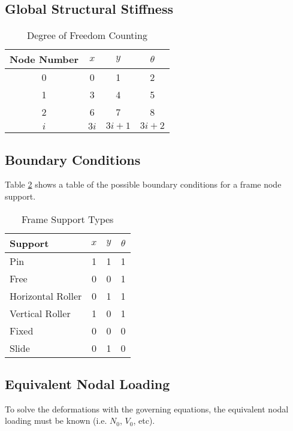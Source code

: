 \subsection{Global Structural Stiffness}


\begin{table}[h]
\centering
\caption{Degree of Freedom Counting}
\label{Tab:FrameDoFCount}
\begin{tabular}{|c|c|c|c|}
\hline
Node Number & $x$ & $y$ & $\theta$ \\ \hline
0 & 0 & 1 & 2\\ \hline
1 & 3 & 4 & 5 \\ \hline
2 & 6 & 7  & 8\\ \hline
$i$ & $3i$ & $3i+1$ & $3i+2$\\ \hline
\end{tabular}
\end{table}




\subsection{Boundary Conditions}

Table \ref{Tab:FrameSupports} shows a table of the possible boundary conditions for a frame node support.

\begin{table}[h]
\centering
\caption{Frame Support Types}
\label{Tab:FrameSupports}
\begin{tabular}{|l|c|c|c|}
\hline
Support & $x$ & $y$ & $\theta$\\ \hline
Pin     & 1 & 1 & 1\\ \hline
Free    & 0 & 0 & 1\\ \hline
Horizontal Roller & 0& 1 & 1 \\ \hline
Vertical Roller & 1 & 0 & 1 \\ \hline
Fixed & 0 & 0 & 0 \\ \hline
Slide & 0 & 1 & 0 \\ \hline
\end{tabular}
\end{table}



\subsection{Equivalent Nodal Loading}
To solve the deformations with the governing equations, the equivalent nodal loading must be known (i.e. $N_0$, $V_0$, etc). 

